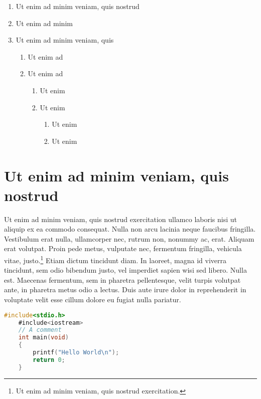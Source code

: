 \lipsum[6-7]

\begin{enumerate}
    \item Ut enim ad minim veniam, quis nostrud
    \item Ut enim ad minim
    \item Ut enim ad minim veniam, quis
    \begin{enumerate}
        \item Ut enim ad
        \item Ut enim ad
        \begin{enumerate}
            \item Ut enim
            \item Ut enim
            \begin{enumerate}
            \item Ut enim
            \item Ut enim
        \end{enumerate}
        \end{enumerate}
    \end{enumerate}
\end{enumerate}


\section{Ut enim ad minim veniam, quis nostrud}

Ut enim ad minim veniam, quis nostrud exercitation ullamco laboris nisi ut
aliquip ex ea commodo consequat. Nulla non arcu lacinia neque faucibus
fringilla. Vestibulum erat nulla, ullamcorper nec, rutrum non, nonummy ac, erat.
Aliquam erat volutpat. Proin pede metus, vulputate nec, fermentum fringilla,
vehicula vitae, justo.\footnote{Ut enim ad minim veniam, quis nostrud
exercitation.} Etiam dictum tincidunt diam. In laoreet, magna id viverra
tincidunt, sem odio bibendum justo, vel imperdiet sapien wisi sed libero. Nulla
est. Maecenas fermentum, sem in pharetra pellentesque, velit turpis volutpat
ante, in pharetra metus odio a lectus. Duis aute irure dolor in reprehenderit in
voluptate velit esse cillum dolore eu fugiat nulla pariatur.

\begin{lstlisting}[caption={~Zbytečný kód},label=list:8-6,captionpos=t,float,abovecaptionskip=-\medskipamount,belowcaptionskip=\medskipamount,language=C]
    #include<stdio.h>
    #include<iostream>
    // A comment
    int main(void)
    {
        printf("Hello World\n");
        return 0;
    }
\end{lstlisting}


